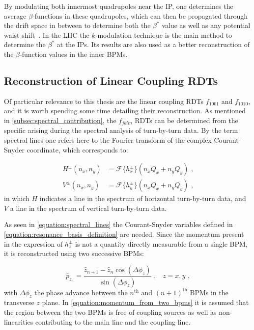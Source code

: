 By modulating both innermost quadrupoles near the IP, one determines the average \(\beta\)-functions in these quadrupoles, which can then be propagated through the drift space in between to determine both the \(\beta^{\ast}\) value as well as any potential waist shift~\cite{PRAB:Carlier:K_Modulation_HL_LHC}.
In the LHC the \(k\)-modulation technique is the main method to determine the \(\beta^{\ast}\) at the \glspl{IP}.
Its results are also used as a better reconstruction of the \(\beta\)-function values in the inner BPMs.

\subsection{Reconstruction of Linear Coupling RDTs}
\label{subsection:reconstruction_linear_coupling_rdts}

Of particular relevance to this thesis are the linear coupling \glspl{RDT} \(f_{1001}\) and \(f_{1010}\), and it is worth spending some time detailing their reconstruction.
As mentioned in \cref{subsec:spectral_contribution}, the \(f_{jklm}\) RDTs can be determined from the specific  arising during the spectral analysis of turn-by-turn data.
By the term spectral lines one refers here to the Fourier transform of the complex Courant-Snyder coordinate, which corresponds to:

\begin{equation}
  \begin{aligned}
    H^\pm(n_x, n_y) &= \mathcal{F}\{h_x^\pm\}(n_x Q_x + n_y Q_y)  \text{ ,}  \\
    V^\pm(n_x, n_y) &= \mathcal{F}\{h_y^\pm\}(n_x Q_x + n_y Q_y)  \text{ ,}
  \end{aligned}
  \label{equation:spectral_lines}
\end{equation}
in which \(H\) indicates a line in the spectrum of horizontal turn-by-turn data, and \(V\) a line in the spectrum of vertical turn-by-turn data.

As seen in \cref{equation:spectral_lines} the Courant-Snyder variables defined in \cref{equation:resonance_basis_definition} are needed.
Since the momentum present in the expression of \(h_z^\pm\) is not a quantity directly measurable from a single BPM, it is reconstructed using two successive BPMs:

\begin{equation}
  \hat{p}_{z_n} = \frac{\hat{z}_{n+1} - \hat{z}_n \cos \left(\Delta \phi_z\right)}{\sin \left(\Delta \phi_z\right)}  \text{ ,} \quad z = x, y \text{ ,}
  \label{equation:momentum_from_two_bpms}
\end{equation}
with \(\Delta \phi_z\) the phase advance between the \(n^{\mathrm{th}}\) and \((n+1)^{\mathrm{th}}\) BPMs in the transverse \(z\) plane.
In \cref{equation:momentum_from_two_bpms} it is assumed that the region between the two BPMs is free of coupling sources as well as non-linearities contributing to the main line and the coupling line.

